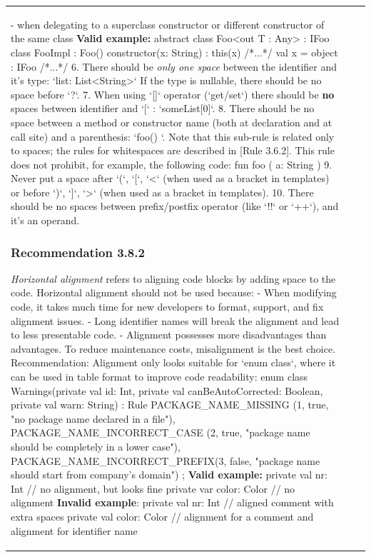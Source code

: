 \begin{center}
\begin{tabular}{ |p{}|p{}|p{}| }
{{{{{    - when delegating to a superclass constructor or different constructor of the same class
\textbf{Valid example:}
  abstract class Foo<out T : Any> : IFoo { }
  class FooImpl : Foo() {
      constructor(x: String) : this(x) { /*...*/ }
      val x = object : IFoo { /*...*/ }
  }
6. There should be \textit{only one space} between the identifier and it's type: `list: List<String>`
If the type is nullable, there should be no space before `?`.
7. When using `[]` operator (`get/set`) there should be \textbf{no} spaces between identifier and `[` : `someList[0]`.
8. There should be no space between a method or constructor name (both at declaration and at call site) and a parenthesis:
   `foo() {}`. Note that this sub-rule is related only to spaces; the rules for whitespaces are described in [Rule 3.6.2].
    This rule does not prohibit, for example, the following code:
fun foo
(
    a: String
)
9. Never put a space after `(`, `[`, `<` (when used as a bracket in templates) or before `)`, `]`, `>` (when used as a bracket in templates).
10. There should be no spaces between prefix/postfix operator (like `!!` or `++`), and it's an operand.
\subsubsection*{\textbf{Recommendation 3.8.2}}
\textit{Horizontal alignment} refers to aligning code blocks by adding space to the code. Horizontal alignment should not be used because:
- When modifying code, it takes much time for new developers to format, support, and fix alignment issues.
- Long identifier names will break the alignment and lead to less presentable code.
- Alignment possesses more disadvantages than advantages. To reduce maintenance costs, misalignment is the best choice.
Recommendation: Alignment only looks suitable for `enum class`, where it can be used in table format to improve code readability:
enum class Warnings(private val id: Int, private val canBeAutoCorrected: Boolean, private val warn: String) : Rule {
    PACKAGE_NAME_MISSING         (1, true,  "no package name declared in a file"),
    PACKAGE_NAME_INCORRECT_CASE  (2, true,  "package name should be completely in a lower case"),
    PACKAGE_NAME_INCORRECT_PREFIX(3, false, "package name should start from company's domain")
    ;
}
\textbf{Valid example:}
 private val nr: Int // no alignment, but looks fine
 private var color: Color // no alignment
\textbf{Invalid example}:
 private val    nr: Int    // aligned comment with extra spaces
 private val color: Color  // alignment for a comment and alignment for identifier name
}}}}}
\end{tabular}
\end{center}
